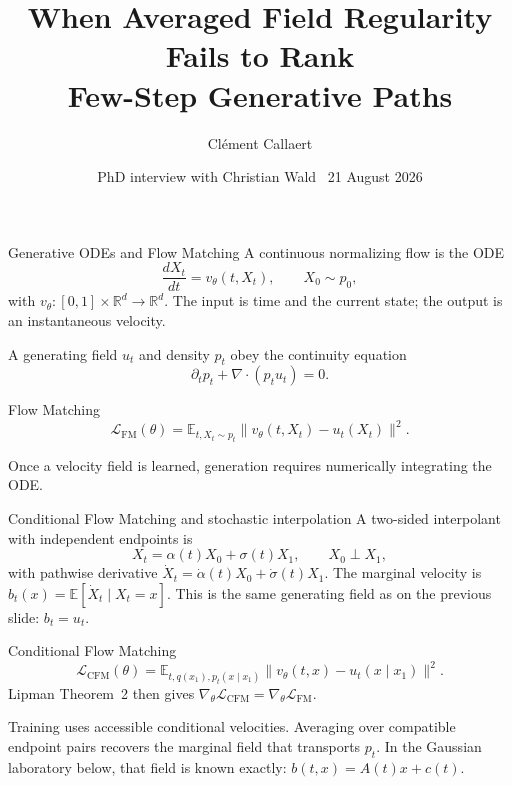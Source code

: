 \documentclass[aspectratio=169,10pt,c]{beamer}
\title[Few-step field regularity]{When Averaged Field Regularity Fails to Rank\\ Few-Step Generative Paths}
\author[C.~Callaert]{Cl\'ement Callaert}
\institute[Paris-Saclay]{CentraleSup\'elec and Universit\'e Paris-Saclay}
\date[21 Aug 2026]{PhD interview with Christian Wald \textbullet\ 21 August 2026}
\newcommand{\citefoot}[1]{{\tiny\color{fsgray}\citep{#1}}}
\begin{document}
\begin{frame}
  \titlepage
\end{frame}

\begin{frame}{Generative ODEs and Flow Matching}
  \small
  A continuous normalizing flow is the ODE
  \[
    \frac{dX_t}{dt}=v_\theta(t,X_t),
    \qquad
    X_0\sim p_0,
  \]
  with
  \(
    v_\theta:[0,1]\times\mathbb{R}^d\to\mathbb{R}^d.
  \)
  The input is time and the current state; the output is an instantaneous velocity.

  A generating field \(u_t\) and density \(p_t\) obey the continuity equation
  \[
    \partial_t p_t+\nabla\cdot(p_t u_t)=0.
  \]

  \begin{block}{Flow Matching}
    \[
      \mathcal{L}_{\mathrm{FM}}(\theta)
      =\mathbb{E}_{t,X_t\sim p_t}
      \bigl\|v_\theta(t,X_t)-u_t(X_t)\bigr\|^2.
    \]
  \end{block}

  Once a velocity field is learned, generation requires numerically integrating the ODE.
  \vspace{0.08cm}
  \citefoot{lipman2023flow}
\end{frame}

\begin{frame}{Conditional Flow Matching and stochastic interpolation}
  \footnotesize
  A two-sided interpolant with independent endpoints is
  \[
    X_t=\alpha(t)X_0+\sigma(t)X_1,
    \qquad X_0\perp X_1,
  \]
  with pathwise derivative \(\dot X_t=\dot\alpha(t)X_0+\dot\sigma(t)X_1\).
  The marginal velocity is
  \(
    b_t(x)=\mathbb{E}[\dot X_t\mid X_t=x].
  \)
  This is the same generating field as on the previous slide:
  \(b_t=u_t\).

  \begin{block}{Conditional Flow Matching}
    \[
      \mathcal{L}_{\mathrm{CFM}}(\theta)
      =\mathbb{E}_{t,q(x_1),p_t(x\mid x_1)}
      \bigl\|v_\theta(t,x)-u_t(x\mid x_1)\bigr\|^2.
    \]
    Lipman Theorem~2 then gives
    \(\nabla_\theta\mathcal{L}_{\mathrm{CFM}}=\nabla_\theta\mathcal{L}_{\mathrm{FM}}\).
  \end{block}

  Training uses accessible conditional velocities. Averaging over compatible
  endpoint pairs recovers the marginal field that transports \(p_t\).
  In the Gaussian laboratory below, that field is known exactly:
  \(b(t,x)=A(t)x+c(t)\).
  \vspace{0.06cm}
  \citefoot{lipman2023flow,albergo2025stochastic}
\end{frame}
\end{document}
